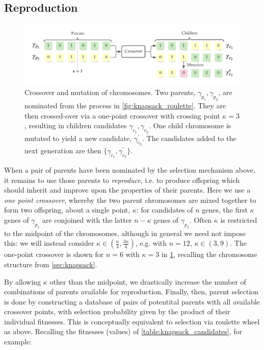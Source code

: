 \subsection{Reproduction}
\begin{figure}
    \begin{center}
        \includegraphics{theoretical_study/figures/chromosomes.pdf}
    \end{center}
    \caption[Crossover and mutation of chromosomes.]{
        Crossover and mutation of chromosomes.
        Two parents, $\gamma_{p_1}, \gamma_{p_2}$, are nominated from the process in \cref{fig:knapsack_roulette}. 
        They are then crossed-over via a one-point crossover with crossing point $\kappa=3$, 
        resulting in children candidates $\gamma_{c_1}, \gamma_{c_2}$. 
        One child chromosome is mutated to yield a new candidate, $\gamma_{c_2}^{\prime}$. 
        The candidates added to the next generation are then $\{ \gamma_{c_1}, \gamma_{c_2}^{\prime} \}$.
    }
    \label{fig:gen_alg_reproduction}
\end{figure}

When a pair of parents have been nominated by the selection mechanism above, 
    it remains to use those parents to \emph{reproduce}, 
    i.e. to produce offspring which should inherit and improve upon the properties of their parents. 
Here we use a \emph{one point crossover}, whereby the two parent chromosomes are mixed together 
    to form two offspring, about a single point, $\kappa$: 
    for candidates of $n$ genes, 
    the first $\kappa$ genes of $\gamma_{p_1}$ are conjoined with the latter $n - \kappa$ genes of $\gamma_{p_2}$. 
Often $\kappa$ is restricted to the midpoint of the chromosomes, although in general we need not impose this: 
    we will instead consider $\kappa \in \left( \frac{n}{4}, \frac{3n}{4} \right)$, 
    e.g. with $n=12$, $\kappa \in (3, 9)$. 
The one-point crossover is shown for $n=6$ with $\kappa=3$ in \cref{fig:gen_alg_reproduction}, 
    recalling the chromosome structure from \cref{sec:knapsack}.
\par 
By allowing $\kappa$ other than the midpoint, we drastically increase the number of combinations of parents available for reproduction. 
Finally, then, parent selection is done by constructing a database of pairs of potentital parents with all available crossover points, 
    with selection probability given by the product of their individual fitnesses. 
This is conceptually equivalent to selection via roulette wheel as above. 
Recalling the fitnesses (values) of \cref{table:knapsack_candidates}, for example: 

